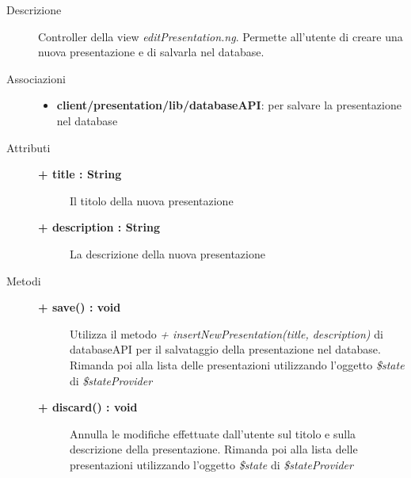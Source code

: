 \begin{description}
\item[Descrizione] \hfill
	Controller della view \textit{editPresentation.ng}. Permette all'utente di creare una nuova presentazione e di salvarla nel database.
	

\item[Associazioni] \hfill
	\begin{itemize}
		\item \textbf{client/presentation/lib/databaseAPI}: per salvare la presentazione nel database
	\end{itemize}

	
\item[Attributi] \hfill
	\begin{description}
		\item[\textbf{+ title : String			}] \hfill
		Il titolo della nuova presentazione
		\item[\textbf{+ description : String			}] \hfill	
		La descrizione della nuova presentazione
	\end{description}
	
	
\item[Metodi] \hfill

	\begin{description}
		\item[\textbf{\color{blue}+ save() : void			}] \hfill
			Utilizza il metodo \textit{+ insertNewPresentation(title, description)} di databaseAPI per il salvataggio della presentazione nel database. Rimanda poi alla lista delle presentazioni utilizzando l'oggetto \textit{\$state} di \textit{\$stateProvider}
	\end{description}
	
	\begin{description}
		\item[\textbf{\color{blue}+ discard() : void			}] \hfill
			Annulla le modifiche effettuate dall'utente sul titolo e sulla descrizione della presentazione. Rimanda poi alla lista delle presentazioni utilizzando l'oggetto \textit{\$state} di \textit{\$stateProvider}
	\end{description}
	
	
	
\end{description}




